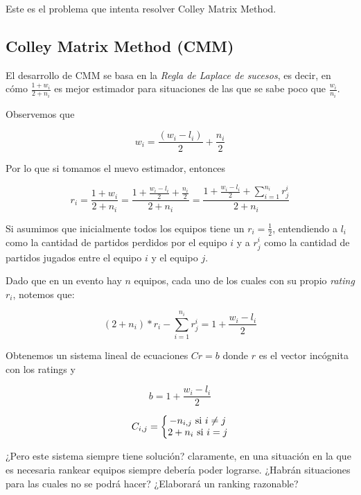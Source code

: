 Este es el problema que intenta resolver Colley Matrix Method.

\subsection{Colley Matrix Method (CMM)}

El desarrollo de CMM se basa en la \textit{Regla de Laplace de sucesos}, es decir, en cómo $\frac{1 + w_i}{2 + n_i}$ es mejor estimador para situaciones de las que se sabe poco que $\frac{w_i}{n_i}$.

Observemos que

\begin{equation}
    w_i = \frac{(w_i - l_i)}{2} + \frac{n_i}{2}
\end{equation}

Por lo que si tomamos el nuevo estimador, entonces

\begin{equation}
    r_i = \frac{1 + w_i}{2 + n_i} = \frac{1 + \frac{w_i - l_i}{2} + \frac{n_i}{2}}{2 + n_i} = \frac{1 + \frac{w_i - l_i}{2} + \sum_{i=1}^{n_i}{r_j^i}}{2 + n_i}
\end{equation}

Si asumimos que inicialmente todos los equipos tiene un $r_i = \frac{1}{2}$, entendiendo a $l_i$ como la cantidad de partidos perdidos por el equipo $i$ y a $r_j^i$ como la cantidad de partidos jugados entre el equipo $i$ y el equipo $j$.

Dado que en un evento hay $n$ equipos, cada uno de los cuales con su propio \textit{rating} $r_i$, notemos que:

\begin{equation}
    (2 + n_i) * r_i - \sum_{i = 1}^{n_i} r_j^i = 1 + \frac{w_i - l_i}{2}
\end{equation}

Obtenemos un sistema lineal de ecuaciones $C r = b$ donde $r$ es el vector incógnita con los ratings y

\begin{equation}
    b = 1 + \frac{w_i - l_i}{2}
\end{equation}

\begin{equation}
    C_{i, j} = \left\lbrace\begin{matrix} 
        -n_{i, j} $ si $ i\neq j\\
        2 + n_i $ si $ i = j\\
    \end{matrix}\right. 
\end{equation}

¿Pero este sistema siempre tiene solución? claramente, en una situación en la que es necesaria rankear equipos siempre debería poder lograrse. ¿Habrán situaciones para las cuales no se podrá hacer? ¿Elaborará un ranking razonable?
